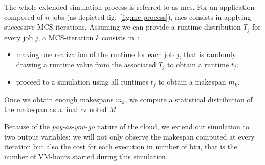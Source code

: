 \documentclass[10pt,conference,compsocconf]{IEEEtran}
\begin{document}
The whole extended simulation process is referred to as \ac{mcs}. 
For an application composed of $n$ jobs (as depicted fig.~\ref{fig:mc-process}),
\ac{mcs} consists in applying successive MCS-iterations. Assuming we can provide a
runtime distribution $T_j$ for every job $j$, a MCS-iteration $k$ consists in~:
\begin{itemize}
\item making one realization of the runtime  for each job $j$, that is randomly
  drawing a runtime value from the associated $T_j$ to obtain a runtime $t_j$;
\item proceed to a simulation using all runtimes $t_j$ to obtain a makespan $m_k$.
\end{itemize}
Once we obtain enough makespans $m_k$, we compute  a statistical distribution of
the makespan  as a final \ac{rv} noted $M$.

Because of the \emph{pay-as-you-go} nature of the cloud, we extend our simulation
to two output variables: we will not only observe the makespan computed at every
iteration but also the cost for each execution in number of \ac{btu}, that is the
number of VM-hours started during this simulation.
\end{document}

